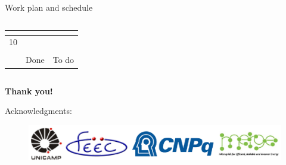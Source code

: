 \documentclass[10pt, aspectratio=1610]{beamer}
\begin{document}
\begin{frame}{Work plan and schedule}
\begin{columns}
\begin{column}[t]{0.5\textwidth}
\begin{table}[]
\begin{tabular}{cllll}
                  \multicolumn{1}{l|}{} &
                  \multicolumn{1}{l|}{} &
                  \multicolumn{1}{l|}{} &
                  \multicolumn{1}{l|}{\cellcolor[HTML]{ef233c}} \\ 
                  \hline
                \multicolumn{1}{|c|}{10} &
                  \multicolumn{1}{l|}{} &
                  \multicolumn{1}{l|}{} &
                  \multicolumn{1}{l|}{} &
                  \multicolumn{1}{l|}{\cellcolor[HTML]{ef233c}} \\ 
                  \hline
                &&&&\\
                 &
                  \multicolumn{2}{c}{\cellcolor[HTML]{bdc6d1}Done} &
                  \multicolumn{2}{c}{\cellcolor[HTML]{ef233c}To do}
                \end{tabular}
                \end{table}
        \end{column}
    \end{columns}
\end{frame}


\begin{frame}
    \begin{large}
        \begin{center}
            \textbf{Thank you!}
        \end{center}
    \end{large}

    \vspace{15pt}

    Acknowledgments:
    \vspace{-0.3cm}
    \begin{figure}
        \centering
        \includegraphics[width=\textwidth]{../Figures/agradecimentos.pdf}
    \end{figure}
\end{frame}
\end{document}
